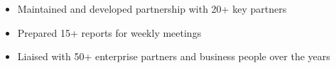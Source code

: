 \documentclass[10pt,a4paper,ragged2e]{altacv}
\begin{document}
\divider

\begin{itemize}
	\item Maintained and developed partnership with 20+ key partners
	\item Prepared 15+ reports for weekly meetings
	\item Liaised with 50+ enterprise partners and business people over the years
\end{itemize}
\end{document}
